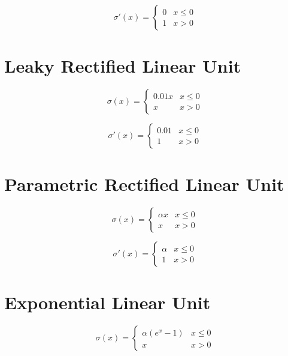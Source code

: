 \documentclass{article}
\begin{document}
\begin{equation}
\sigma'(x) =
  \begin{cases}
    0 & x \leq 0\\
    1 & x > 0
  \end{cases}
\end{equation}

\section{Leaky Rectified Linear Unit}

\begin{equation}
  \sigma(x) =
    \begin{cases}
      0.01x & x \leq 0\\
      x & x > 0
    \end{cases}
  \end{equation}
  
  \begin{equation}
  \sigma'(x) =
    \begin{cases}
      0.01 & x \leq 0\\
      1 & x > 0
    \end{cases}
  \end{equation}

\section{Parametric Rectified Linear Unit}

\begin{equation}
  \sigma(x) =
    \begin{cases}
      \alpha x & x \leq 0\\
      x & x > 0
    \end{cases}
\end{equation}

\begin{equation}
  \sigma'(x) =
    \begin{cases}
      \alpha & x \leq 0\\
      1 & x > 0
    \end{cases}
\end{equation}

\section{Exponential Linear Unit}

\begin{equation}
  \sigma(x) =
    \begin{cases}
      \alpha(e^x - 1) & x \leq 0\\
      x & x > 0
    \end{cases}
\end{equation}
\end{document}
